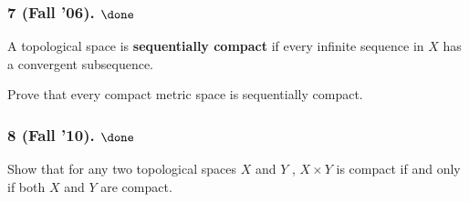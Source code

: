 \hypertarget{fall-06.-done}{%
\subsubsection{\texorpdfstring{7 (Fall '06).
\(\done\)}{7 (Fall '06). \textbackslash done}}\label{fall-06.-done}}

A topological space is \textbf{sequentially compact} if every infinite
sequence in \(X\) has a convergent subsequence.

Prove that every compact metric space is sequentially compact.

\hypertarget{fall-10.-done}{%
\subsubsection{\texorpdfstring{8 (Fall '10).
\(\done\)}{8 (Fall '10). \textbackslash done}}\label{fall-10.-done}}

Show that for any two topological spaces \(X\) and \(Y\) ,
\(X \times Y\) is compact if and only if both \(X\) and \(Y\) are
compact.

